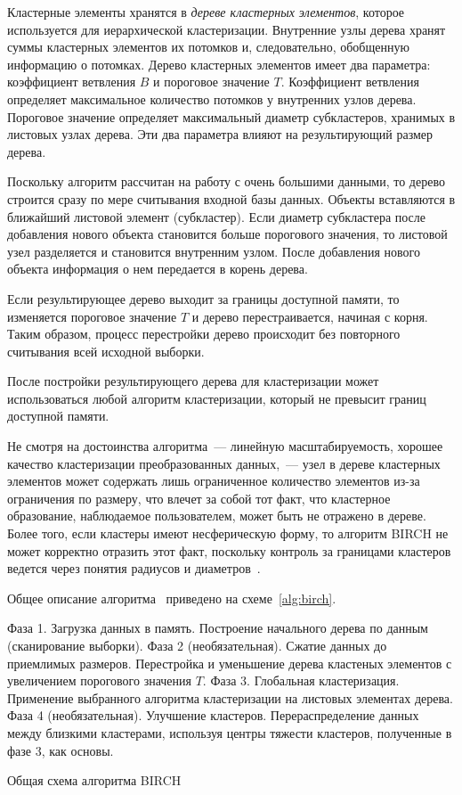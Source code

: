 Кластерные элементы хранятся в \emph{дереве кластерных элементов}, которое используется для иерархической кластеризации. Внутренние узлы дерева хранят суммы кластерных элементов их потомков и, следовательно, обобщенную информацию о потомках. Дерево кластерных элементов имеет два параметра: коэффициент ветвления \( B \) и пороговое значение \( T \). Коэффициент ветвления определяет максимальное количество потомков у внутренних узлов дерева. Пороговое значение определяет максимальный диаметр субкластеров, хранимых в листовых узлах дерева. Эти два параметра влияют на результирующий размер дерева.

Поскольку алгоритм рассчитан на работу с очень большими данными, то дерево строится сразу по мере считывания входной базы данных. Объекты вставляются в ближайший листовой элемент (субкластер). Если диаметр субкластера после добавления нового объекта становится больше порогового значения, то листовой узел разделяется и становится внутренним узлом. После добавления нового объекта информация о нем передается в корень дерева.

Если результирующее дерево выходит за границы доступной памяти, то изменяется пороговое значение \( T \) и дерево перестраивается, начиная с корня. Таким образом, процесс перестройки дерево происходит без повторного считывания всей исходной выборки.

После постройки результирующего дерева для кластеризации может использоваться любой алгоритм кластеризации, который не превысит границ доступной памяти.

Не смотря на достоинства алгоритма~--- линейную масштабируемость, хорошее качество кластеризации преобразованных данных,~--- узел в дереве кластерных элементов может содержать лишь ограниченное количество элементов из-за ограничения по размеру, что влечет за собой тот факт, что кластерное образование, наблюдаемое пользователем, может быть не отражено в дереве. Более того, если кластеры имеют несферическую форму, то алгоритм BIRCH не может корректно отразить этот факт, поскольку контроль за границами кластеров ведется через понятия радиусов и диаметров~\cite{cod, birch}.

Общее описание алгоритма~\cite[с.~2]{neiskiy} приведено на схеме~\ref{alg:birch}.

\begin{algorithm}
    \DontPrintSemicolon
    Фаза 1. Загрузка данных в память.\;
    Построение начального дерева по данным (сканирование выборки).\;
    Фаза 2 (необязательная). Сжатие данных до приемлимых размеров.\;
    Перестройка и уменьшение дерева кластеных элементов с увеличением порогового значения \( T \).\;
    Фаза 3. Глобальная кластеризация.\;
    Применение выбранного алгоритма кластеризации на листовых элементах дерева.\;
    Фаза 4 (необязательная). Улучшение кластеров.\;
    Перераспределение данных между близкими кластерами, используя центры тяжести кластеров, полученные в фазе 3, как основы.\;
    \caption{Общая схема алгоритма BIRCH}
    \label{alg:birch}
\end{algorithm}

